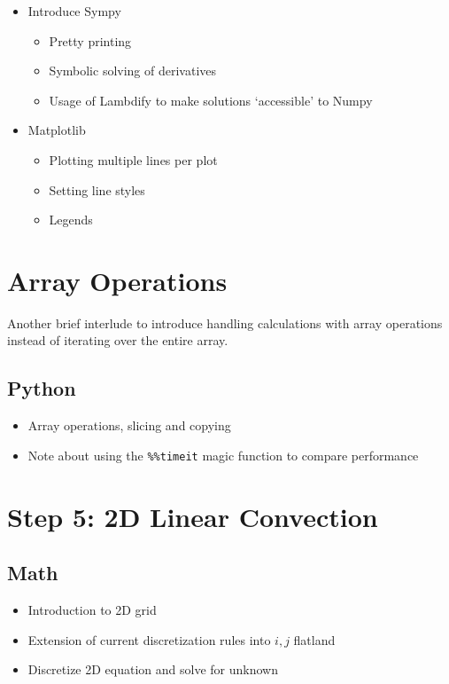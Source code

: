 \documentclass[10pt,a4paper]{report}
\begin{document}
\begin{itemize}
\item[] Introduce Sympy
\begin{itemize}
\item[] Pretty printing
\item[] Symbolic solving of derivatives
\item[] Usage of Lambdify to make solutions `accessible' to Numpy
\end{itemize}
\item[] Matplotlib
\begin{itemize}
\item[] Plotting multiple lines per plot
\item[] Setting line styles
\item[] Legends
\end{itemize}
\end{itemize}

\section*{Array Operations}
Another brief interlude to introduce handling calculations with array operations instead of iterating over the entire array.

\subsection*{Python}

\begin{itemize}
\item[] Array operations, slicing and copying
\item[] Note about using the  \verb|%%timeit| magic function to compare performance
\end{itemize}

\section*{Step 5: 2D Linear Convection}

\subsection*{Math}
\begin{itemize}
\item[] Introduction to 2D grid
\item[] Extension of current discretization rules into $i,j$ flatland
\item[] Discretize 2D equation and solve for unknown
\end{itemize}
\end{document}
